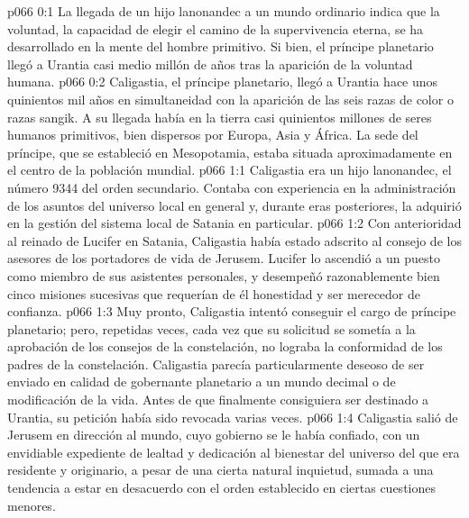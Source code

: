 \author{Melquisedec}
\vs p066 0:1 La llegada de un hijo lanonandec a un mundo ordinario indica que la voluntad, la capacidad de elegir el camino de la supervivencia eterna, se ha desarrollado en la mente del hombre primitivo. Si bien, el príncipe planetario llegó a Urantia casi medio millón de años tras la aparición de la voluntad humana.
\vs p066 0:2 Caligastia, el príncipe planetario, llegó a Urantia hace unos quinientos mil años en simultaneidad con la aparición de las seis razas de color o razas sangik. A su llegada había en la tierra casi quinientos millones de seres humanos primitivos, bien dispersos por Europa, Asia y África. La sede del príncipe, que se estableció en Mesopotamia, estaba situada aproximadamente en el centro de la población mundial.
\vs p066 1:1 Caligastia era un hijo lanonandec, el número 9344 del orden secundario. Contaba con experiencia en la administración de los asuntos del universo local en general y, durante eras posteriores, la adquirió en la gestión del sistema local de Satania en particular.
\vs p066 1:2 Con anterioridad al reinado de Lucifer en Satania, Caligastia había estado adscrito al consejo de los asesores de los portadores de vida de Jerusem. Lucifer lo ascendió a un puesto como miembro de sus asistentes personales, y desempeñó razonablemente bien cinco misiones sucesivas que requerían de él honestidad y ser merecedor de confianza.
\vs p066 1:3 \pc Muy pronto, Caligastia intentó conseguir el cargo de príncipe planetario; pero, repetidas veces, cada vez que su solicitud se sometía a la aprobación de los consejos de la constelación, no lograba la conformidad de los padres de la constelación. Caligastia parecía particularmente deseoso de ser enviado en calidad de gobernante planetario a un mundo decimal o de modificación de la vida. Antes de que finalmente consiguiera ser destinado a Urantia, su petición había sido revocada varias veces.
\vs p066 1:4 Caligastia salió de Jerusem en dirección al mundo, cuyo gobierno se le había confiado, con un envidiable expediente de lealtad y dedicación al bienestar del universo del que era residente y originario, a pesar de una cierta natural inquietud, sumada a una tendencia a estar en desacuerdo con el orden establecido en ciertas cuestiones menores.
